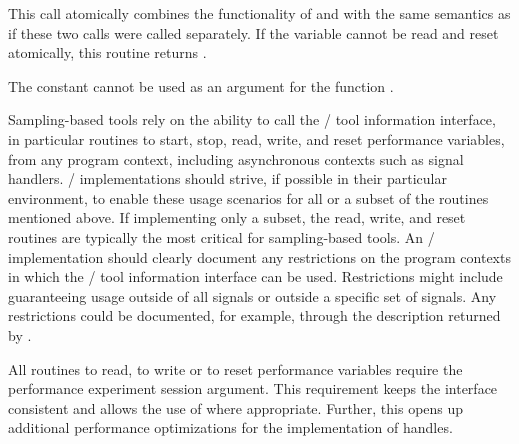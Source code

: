 This call atomically combines the functionality of
 and  with the
same semantics as if these two calls were called separately.  If the
variable cannot be read and reset atomically, this routine returns
.

The constant  cannot be used as an
argument for the  function .

\begin{implementors}
Sampling-based tools rely on the ability to call the \MPI/ tool information
interface, in particular routines to start, stop, read, write, and reset
performance variables, from any program context, including asynchronous
contexts such as signal handlers.  \MPI/ implementations should strive, if
possible in their particular environment, to enable these usage scenarios
for all or a subset of the routines mentioned above.  If implementing only
a subset, the read, write, and reset routines are typically the most
critical for sampling-based tools.  An \MPI/ implementation should clearly
document any restrictions on the program contexts in which the \MPI/ tool
information interface can be used.  Restrictions might include guaranteeing
usage outside of all signals or outside a specific set of signals.  Any
restrictions could be documented, for example, through the description
returned by .
\end{implementors}

\begin{rationale}
All routines to read, to write or to reset performance variables require
the performance experiment session argument.  This requirement keeps the interface consistent and
allows the use of   where appropriate.
Further, this opens up additional performance optimizations for the
implementation of handles.
\end{rationale}


